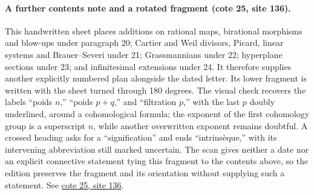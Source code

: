 \paragraph{A further contents note and a rotated fragment (cote 25, site 136).}
This handwritten sheet places additions on rational maps, birational morphisms and blow-ups under paragraph 20; Cartier and Weil divisors, Picard, linear systems and Brauer--Severi under 21; Grassmannians under 22; hyperplane sections under 23; and infinitesimal extensions under 24. It therefore supplies another explicitly numbered plan alongside the dated letter. Its lower fragment is written with the sheet turned through 180 degrees. The visual check recovers the labels ``poids $n$,'' ``poids $p+q$,'' and ``filtration $p$,'' with the last $p$ doubly underlined, around a cohomological formula; the exponent of the first cohomology group is a superscript $n$, while another overwritten exponent remains doubtful. A crossed heading asks for a ``signification'' and ends ``intrinsèque,'' with its intervening abbreviation still marked uncertain. The scan gives neither a date nor an explicit connective statement tying this fragment to the contents above, so the edition preserves the fragment and its orientation without supplying such a statement. See \href{https://grothendieck.umontpellier.fr/web/viewer.html?file=../25.pdf#page=137}{cote 25, site 136}.

